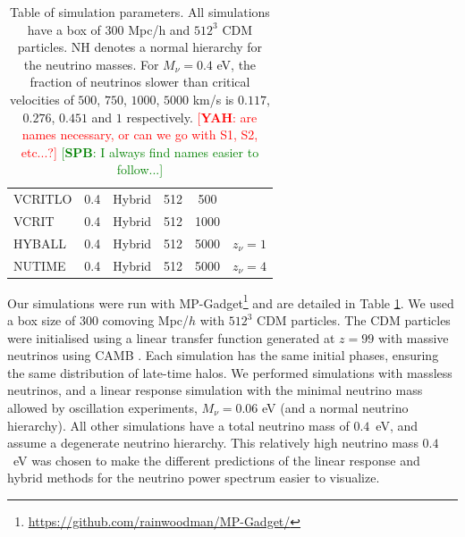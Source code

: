 \documentclass[useAMS, usenatbib]{mnras}
\newcommand{\spb}[1]{{\textcolor{green}{[{\bf SPB}: #1]}}}
\newcommand{\yah}[1]{{\textcolor{red}{[{\bf YAH}: #1]}}}
\begin{document}
\begin{table}
\begin{center}
\begin{tabular}{|l|c|c|c|c|l|}
VCRITLO    &     0.4             &   Hybrid      & 512       & 500 & \\
VCRIT    &     0.4             &   Hybrid      & 512       & 1000 & \\
HYBALL    &     0.4             &   Hybrid      & 512       & 5000 & $z_\nu = 1$ \\
NUTIME    &     0.4             &   Hybrid      & 512       & 5000 & $z_\nu = 4$  \\
\hline
\end{tabular}
\end{center}
\caption{Table of simulation parameters. All simulations have a box of $300$ Mpc/h
and $512^3$ CDM particles. NH denotes a normal hierarchy for the neutrino masses.
For $M_\nu = 0.4$ eV, the fraction of neutrinos slower than critical velocities of $500$, $750$, $1000$, $5000$ km/s is $0.117$, $0.276$, $0.451$ and $1$ respectively. \yah{are names necessary, or can we go with S1, S2, etc...?} \spb{I always find names easier to follow...}}
\label{tab:simulations}
\end{table}


%

Our simulations were run with MP-Gadget\footnote{\url{https://github.com/rainwoodman/MP-Gadget/}} and are detailed in Table \ref{tab:simulations}. We used a box size of $300$ comoving Mpc/$h$ with $512^3$ CDM particles.
The CDM particles were initialised using a linear transfer function generated at $z=99$ with massive neutrinos using CAMB \citep{CAMB_neutrinos}. Each simulation has the same initial phases, ensuring the same distribution of late-time halos. We performed simulations with massless neutrinos, and a linear response simulation with the minimal neutrino mass allowed by oscillation experiments, $M_\nu = 0.06$ eV (and a normal neutrino hierarchy). All other simulations have a total neutrino mass of $0.4$~eV, and assume a degenerate neutrino hierarchy. This relatively high neutrino mass $0.4$~eV was chosen to make the different predictions of the linear response and hybrid methods for the neutrino power spectrum easier to visualize.
\end{document}
